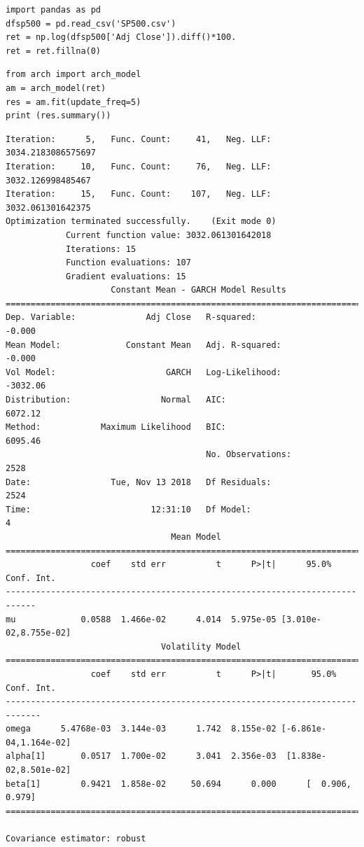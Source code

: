 \documentclass[12pt,fleqn]{article}\usepackage{../../common}
\begin{document}
\begin{verbatim}
import pandas as pd
dfsp500 = pd.read_csv('SP500.csv')
ret = np.log(dfsp500['Adj Close']).diff()*100.
ret = ret.fillna(0)
\end{verbatim}

\begin{verbatim}
from arch import arch_model
am = arch_model(ret)
res = am.fit(update_freq=5)
print (res.summary())
\end{verbatim}

\begin{verbatim}
Iteration:      5,   Func. Count:     41,   Neg. LLF: 3034.2183086575697
Iteration:     10,   Func. Count:     76,   Neg. LLF: 3032.126998485467
Iteration:     15,   Func. Count:    107,   Neg. LLF: 3032.061301642375
Optimization terminated successfully.    (Exit mode 0)
            Current function value: 3032.061301642018
            Iterations: 15
            Function evaluations: 107
            Gradient evaluations: 15
                     Constant Mean - GARCH Model Results                      
==============================================================================
Dep. Variable:              Adj Close   R-squared:                      -0.000
Mean Model:             Constant Mean   Adj. R-squared:                 -0.000
Vol Model:                      GARCH   Log-Likelihood:               -3032.06
Distribution:                  Normal   AIC:                           6072.12
Method:            Maximum Likelihood   BIC:                           6095.46
                                        No. Observations:                 2528
Date:                Tue, Nov 13 2018   Df Residuals:                     2524
Time:                        12:31:10   Df Model:                            4
                                 Mean Model                                 
============================================================================
                 coef    std err          t      P>|t|      95.0% Conf. Int.
----------------------------------------------------------------------------
mu             0.0588  1.466e-02      4.014  5.975e-05 [3.010e-02,8.755e-02]
                               Volatility Model                              
=============================================================================
                 coef    std err          t      P>|t|       95.0% Conf. Int.
-----------------------------------------------------------------------------
omega      5.4768e-03  3.144e-03      1.742  8.155e-02 [-6.861e-04,1.164e-02]
alpha[1]       0.0517  1.700e-02      3.041  2.356e-03  [1.838e-02,8.501e-02]
beta[1]        0.9421  1.858e-02     50.694      0.000      [  0.906,  0.979]
=============================================================================

Covariance estimator: robust
\end{verbatim}
\end{document}
